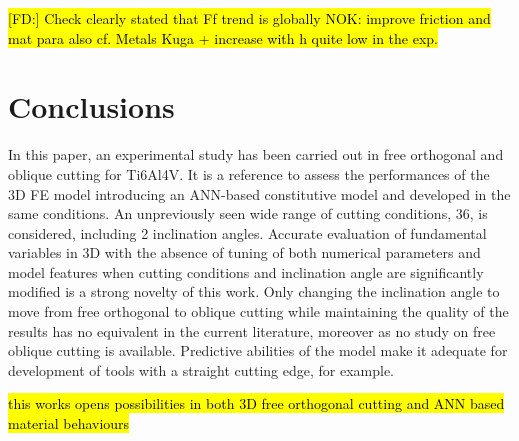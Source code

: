 \documentclass[preprint,12pt,times]{elsarticle}
\DeclareRobustCommand{\FD}[1]{ {\begingroup\sethlcolor{VWgreen}\textcolor{black}{\hl{[FD:] #1}}\endgroup} }
\begin{document}
\FD{Check clearly stated that Ff trend is globally NOK: improve friction and mat para also cf. Metals Kuga + increase with h quite low in the exp.}
\section{Conclusions}

In this paper, an experimental study has been carried out in free orthogonal and oblique cutting for Ti6Al4V. It is a reference to assess the performances of the 3D FE model introducing an ANN-based constitutive model and developed in the same conditions. An unpreviously seen wide range of cutting conditions, 36, is considered, including 2 inclination angles.
Accurate evaluation of fundamental variables in 3D with the absence of tuning of both numerical parameters and model features when cutting conditions and inclination angle are significantly modified is a strong novelty of this work. Only changing the inclination angle to move from free orthogonal to oblique cutting while maintaining the quality of the results has no equivalent in the current literature, moreover as no study on free oblique cutting is available. Predictive abilities of the model make it adequate for development of tools with a straight cutting edge, for example.

\hl{this works opens possibilities in both 3D free orthogonal cutting and ANN based material behaviours}

%
%


%
%
%
%


%
%
%

\appendix
%
\end{document}
